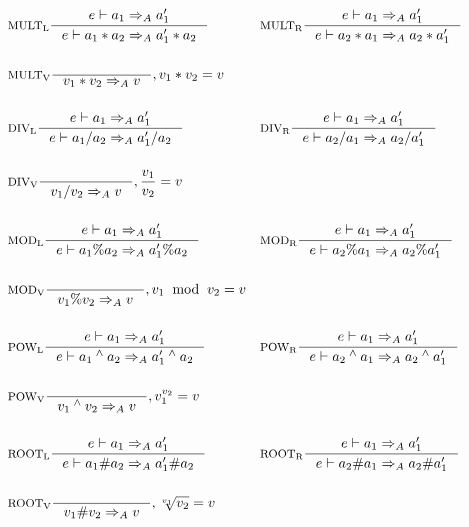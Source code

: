 \begin{align*}
&\inference[$\text{MULT}_\text{L}$]{e \vdash a_1 \Rightarrow_A a_1'}
                     {e \vdash a_1 * a_2 \Rightarrow_A a_1' * a_2}
&
&\inference[$\text{MULT}_\text{R}$]{e \vdash a_1 \Rightarrow_A a_1'}
                     {e \vdash a_2 * a_1 \Rightarrow_A a_2 * a_1'}
\\\\
&\inference[$\text{MULT}_\text{V}$]{}
                     {v_1 * v_2 \Rightarrow_A v}
										 {, v_1 * v_2 = v}
\\\\
&\inference[$\text{DIV}_\text{L}$]{e \vdash a_1 \Rightarrow_A a_1'}
                    {e \vdash a_1 / a_2 \Rightarrow_A a_1' / a_2}
&
&\inference[$\text{DIV}_\text{R}$]{e \vdash a_1 \Rightarrow_A a_1'}
                    {e \vdash a_2 / a_1 \Rightarrow_A a_2 / a_1'}
\\\\
&\inference[$\text{DIV}_\text{V}$]{}
                    {v_1 / v_2 \Rightarrow_A v}
										{, \frac{v_1}{v_2} = v}
\\\\
&\inference[$\text{MOD}_\text{L}$]{e \vdash a_1 \Rightarrow_A a_1'}
                    {e \vdash a_1 \% a_2 \Rightarrow_A a_1' \% a_2}
&
&\inference[$\text{MOD}_\text{R}$]{e \vdash a_1 \Rightarrow_A a_1'}
                    {e \vdash a_2 \% a_1 \Rightarrow_A a_2 \% a_1'}
\\\\
&\inference[$\text{MOD}_\text{V}$]{}
                    {v_1 \% v_2 \Rightarrow_A v}
										{, v_1 \;\; \textrm{mod} \;\; v_2 = v}
\\\\
&\inference[$\text{POW}_\text{L}$]{e \vdash a_1  \Rightarrow_A a_1'}
                    {e \vdash a_1 \Twedge a_2 \Rightarrow_A a_1' \Twedge a_2}
&
&\inference[$\text{POW}_\text{R}$]{e \vdash a_1 \Rightarrow_A a_1'}
                    {e \vdash a_2 \Twedge a_1 \Rightarrow_A a_2 \Twedge a_1'}
\\\\
&\inference[$\text{POW}_\text{V}$]{}
                    {v_1 \Twedge v_2 \Rightarrow_A v}
										{, v_1 ^ {v_2} = v}
\\\\
&\inference[$\text{ROOT}_\text{L}$]{e \vdash a_1 \Rightarrow_A a_1'}
                    {e \vdash a_1 \# a_2 \Rightarrow_A a_1' \# a_2}
&
&\inference[$\text{ROOT}_\text{R}$]{e \vdash a_1 \Rightarrow_A a_1'}
                    {e \vdash a_2 \# a_1 \Rightarrow_A a_2 \# a_1'}
\\\\
&\inference[$\text{ROOT}_\text{V}$]{}
                    {v_1 \# v_2 \Rightarrow_A v}
										{, \sqrt[v_1]{v_2} = v}
\end{align*}

